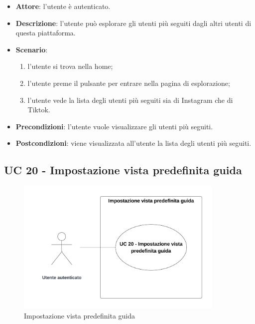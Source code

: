 \begin{itemize}
    \item \textbf{Attore}: l'utente è autenticato.
    \item \textbf{Descrizione}: l'utente può esplorare gli utenti più seguiti dagli altri utenti di questa piattaforma.
    \item \textbf{Scenario}:
    \begin{enumerate}
        \item l'utente si trova nella home;
        \item l'utente preme il pulsante per entrare nella pagina di esplorazione;
        \item l'utente vede la lista degli utenti più seguiti sia di Instagram che di Tiktok.
    \end{enumerate}

    \item \textbf{Precondizioni}: l'utente vuole visualizzare gli utenti più seguiti.
    \item \textbf{Postcondizioni}: viene visualizzata all'utente la lista degli utenti più seguiti.
\end{itemize}

\subsection{UC 20 - Impostazione vista predefinita guida}

\begin{figure}[!h]
    \includegraphics[width=10cm]{sezioni/Images/UC20.png}
    \centering
    \caption{Impostazione vista predefinita guida}
\end{figure}


